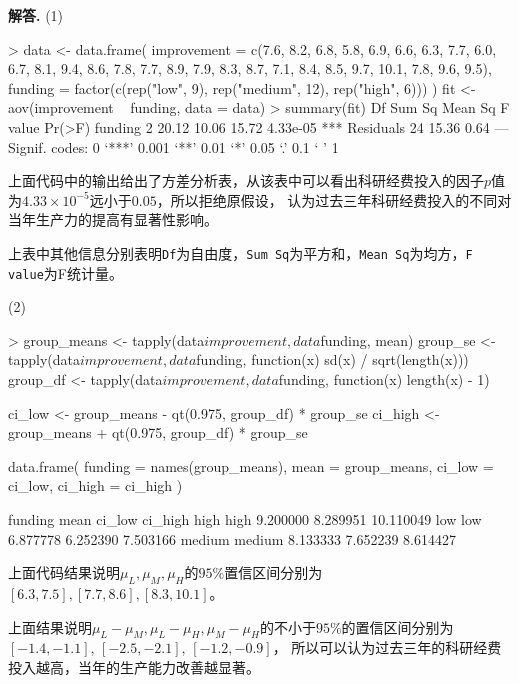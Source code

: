 \documentclass[12pt, a4paper, oneside]{ctexart}
\newenvironment{solution}[1][]{\par\noindent\textbf{#1解答. }}{\smallskip\par}  %
\begin{document}
\begin{solution}
    (1)
    \begin{rcode}
> data <- data.frame(
  improvement = c(7.6, 8.2, 6.8, 5.8, 6.9, 6.6, 6.3, 7.7, 6.0,
  6.7, 8.1, 9.4, 8.6, 7.8, 7.7, 8.9, 7.9, 8.3, 8.7, 7.1, 8.4,
  8.5, 9.7, 10.1, 7.8, 9.6, 9.5),
  funding = factor(c(rep("low", 9), rep("medium", 12), rep("high", 6)))
)
fit <- aov(improvement ~ funding, data = data)
> summary(fit)
            Df Sum Sq Mean Sq F value   Pr(>F)    
funding      2  20.12   10.06   15.72 4.33e-05 ***
Residuals   24  15.36    0.64                     
---
Signif. codes:  0 ‘***’ 0.001 ‘**’ 0.01 ‘*’ 0.05 ‘.’ 0.1 ‘ ’ 1
    \end{rcode}
    上面代码中的输出给出了方差分析表，从该表中可以看出科研经费投入的因子$p$值为$4.33\times 10^{-5}$远小于$0.05$，所以拒绝原假设，
    认为过去三年科研经费投入的不同对当年生产力的提高有显著性影响。

    上表中其他信息分别表明\texttt{Df}为自由度，\texttt{Sum Sq}为平方和，\texttt{Mean Sq}为均方，\texttt{F value}为F统计量。

    (2)
    \begin{rcode}
> group_means <- tapply(data$improvement, data$funding, mean)
group_se <- tapply(data$improvement, data$funding, function(x) sd(x) / sqrt(length(x)))
group_df <- tapply(data$improvement, data$funding, function(x) length(x) - 1)

ci_low <- group_means - qt(0.975, group_df) * group_se
ci_high <- group_means + qt(0.975, group_df) * group_se

data.frame(
  funding = names(group_means),
  mean = group_means,
  ci_low = ci_low,
  ci_high = ci_high
)


       funding     mean   ci_low   ci_high
high      high 9.200000 8.289951 10.110049
low        low 6.877778 6.252390  7.503166
medium  medium 8.133333 7.652239  8.614427
    \end{rcode}
    上面代码结果说明$\mu_L,\mu_M,\mu_H$的$95\%$置信区间分别为$[6.3,7.5],[7.7,8.6],[8.3,10.1]$。
    上面结果说明$\mu_L-\mu_M,\mu_L-\mu_H,\mu_M-\mu_H$的不小于$95\%$的置信区间分别为$[-1.4,-1.1]$, $[-2.5,-2.1]$, $[-1.2,-0.9]$，
    所以可以认为过去三年的科研经费投入越高，当年的生产能力改善越显著。
\end{solution}
\end{document}
